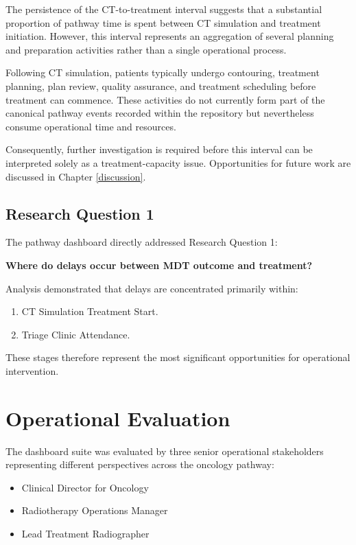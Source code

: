 The persistence of the CT-to-treatment interval suggests that a substantial proportion of pathway time is spent between CT simulation and treatment initiation. However, this interval represents an aggregation of several planning and preparation activities rather than a single operational process. 

Following CT simulation, patients typically undergo contouring, treatment planning, plan review, quality assurance, and treatment scheduling before treatment can commence. These activities do not currently form part of the canonical pathway events recorded within the repository but nevertheless consume operational time and resources. 

Consequently, further investigation is required before this interval can be interpreted solely as a treatment-capacity issue. Opportunities for future work are discussed in Chapter \ref{discussion}.

\subsection{Research Question 1}
The pathway dashboard directly addressed Research Question 1:

\textbf{Where do delays occur between MDT outcome and treatment?}

Analysis demonstrated that delays are concentrated primarily within:

\begin{enumerate}
    \item CT Simulation \textrightarrow Treatment Start.
    \item Triage \textrightarrow Clinic Attendance.
\end{enumerate}

These stages therefore represent the most significant opportunities for operational intervention. 

\section{Operational Evaluation}

The dashboard suite was evaluated by three senior operational stakeholders representing different perspectives across the oncology pathway:

\begin{itemize}
    \item Clinical Director for Oncology
    \item Radiotherapy Operations Manager
    \item Lead Treatment Radiographer
\end{itemize}


